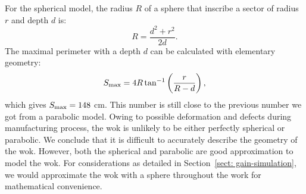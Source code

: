 \documentclass[12pt]{article}
\begin{document}
    For the spherical model, the radius $R$ of a sphere that inscribe a sector of radius $r$ and depth $d$ is:
    \begin{equation}
        R = \frac{d^2 + r^2}{2d}.
    \end{equation}
    The maximal perimeter with a depth $d$ can be calculated with elementary geometry:
    \begin{equation}
        S_{\rm max} = 4R \tan^{-1}\left( \frac{r}{R-d} \right),
    \end{equation}
    which gives $S_{\rm max} = 148$ cm.
    This number is still close to the previous number we got from a parabolic model. 
    Owing to possible deformation and defects during manufacturing process, the wok is unlikely to be either perfectly spherical or parabolic.
    We conclude that it is difficult to accurately describe the geometry of the wok.
    However, both the spherical and parabolic are good approximation to model the wok. 
    For considerations as detailed in Section~\ref{sect: gain-simulation}, we would approximate the wok with a sphere throughout the work for mathematical convenience.
    
    \raggedright
	
	
\end{document}
